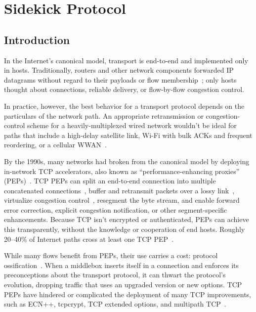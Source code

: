 \chapter{Sidekick Protocol}
\label{sec:sidekick}

\section{Introduction}
\label{sec:sidekick:intro}

In the Internet's canonical model, transport is end-to-end and implemented only
in hosts. Traditionally, routers and other network components forwarded IP
datagrams without regard to their payloads or flow membership~\cite
{saltzer1984endtoend, clark1988darpa}; only hosts thought about connections,
reliable delivery, or flow-by-flow congestion control.

In practice, however, the best behavior for a transport protocol depends on the
particulars of the network path. An appropriate retransmission or
congestion-control scheme for a heavily-multiplexed wired network wouldn't be
ideal for paths that include a high-delay satellite link, Wi-Fi with bulk ACKs
and frequent reordering, or a cellular WWAN~\cite
{kuhn2021quic-over-sat,goyal2017abc}.

By the 1990s, many networks had broken from the canonical model by deploying
in-network TCP accelerators, also known as ``performance-enhancing proxies''
(PEPs)~\cite{rfc3135}. TCP PEPs can split an end-to-end connection into
multiple concatenated connections~\cite
{kapoor2005achieving,caini2006pepsal,davern2011httpep,farkas2012splittcp,hayes2019mmwave},
buffer and retransmit packets over a lossy link~\cite
{balakrishnan1995snoop,polese2017milliproxy}, virtualize congestion
control~\cite{cronkite2016vcc,he2016acdc,mihaly2012mobilePEP}, resegment the
byte stream, and enable forward error correction, explicit congestion
notification, or other segment-specific enhancements. Because TCP isn't
encrypted or authenticated, PEPs can achieve this transparently, without the
knowledge or cooperation of end hosts. Roughly 20--40\% of Internet paths cross
at least one TCP PEP~\cite{imc2011handley, edeline2019bottomup}.

While many flows benefit from PEPs, their use carries a cost: protocol
ossification~\cite{papastergiou2017deossifying, edeline2019bottomup}. When a
middlebox inserts itself in a connection and enforces its preconceptions about
the transport protocol, it can thwart the protocol's evolution, dropping
traffic that uses an upgraded version or new options. TCP PEPs have hindered or
complicated the deployment of many TCP improvements, such as ECN++, tcpcrypt,
TCP extended options, and multipath TCP~\cite
{mandalari2018ecnplusplus,imc2011handley,raiciu2012multipathtcp}.

